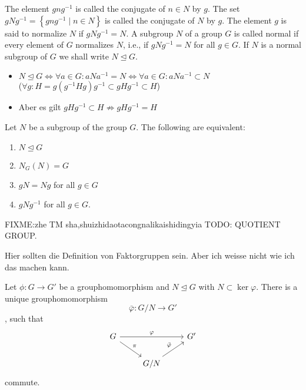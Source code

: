 \begin{definition}[normal]
    The element $g n g^{-1}$ is called the conjugate of $n \in N$ by $g$. The set $g N g^{-1}=\left\{g n g^{-1} \mid n \in N\right\}$ is called the conjugate of $N$ by $g$. The element $g$ is said to normalize $N$ if $g N g^{-1}=N$. A subgroup $N$ of a group $G$ is called normal if every element of $G$ normalizes $N$, i.e., if $g N g^{-1}=N$ for all $g \in G$. If $N$ is a normal subgroup of $G$ we shall write $N \unlhd G$.
\end{definition}


\begin{remark}
    \begin{itemize}
        \item  $
            N\unlhd G
            \Leftrightarrow  \forall a \in G : aNa^{-1} = N
            \Leftrightarrow  \forall a \in G : aNa^{-1} \subset N$\\
            ($\forall g :H = g(g^{-1}Hg)g^{-1}\subset gHg^{-1}\subset H$)
        \item  Aber es gilt \(gHg^{-1} \subset H \not \Rightarrow gHg^{-1} = H \)
    \end{itemize}
\end{remark}

\begin{theorem}
    Let $N$ be a subgroup of the group $G$. The following are equivalent:
    \begin{enumerate}
        \item $N \unlhd G$
        \item $N_G(N) = G$
        \item $gN=Ng$ for all $g\in G$
        \item $gNg^{-1} $ for all $g\in G$.
    \end{enumerate}
\end{theorem}

FIXME:zhe TM sha,shuizhidaotacongnalikaishidingyia
TODO: QUOTIENT GROUP.

Hier sollten die Definition von Faktorgruppen sein. Aber ich weisse nicht wie ich das machen kann.

\begin{definition}[Faktorgruppe]
    
\end{definition}

\begin{theorem}
    Let $\phi : G\to G'$ be a grouphomomorphism and $N\unlhd G$ with $N\subset \ker \varphi$. There is a unique grouphomomorphism $$\bar{\varphi}: G/N\to G'$$, such that $$
    \begin{tikzcd}
        G \arrow[rr, "\varphi"] \arrow[rd, "\pi"] &                                 & G' \\
                                                  & G/N \arrow[ru, "\bar{\varphi}"] &   
        \end{tikzcd}$$ commute.
\end{theorem}

